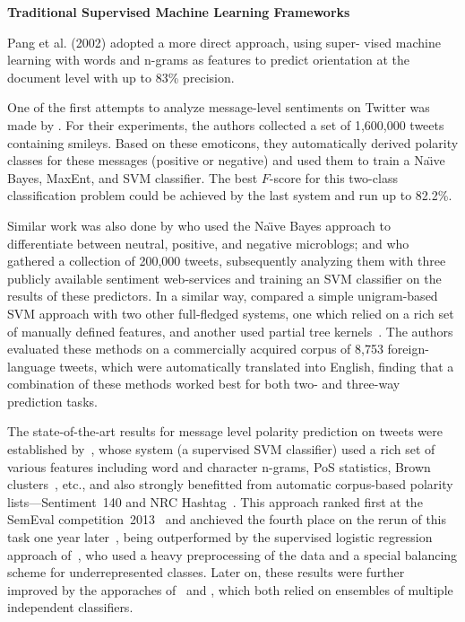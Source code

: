 
\textbf{Traditional Supervised Machine Learning Frameworks}


Pang et al.  (2002) adopted a more direct approach, using super- vised
machine learning with words and n-grams as features to predict
orientation at the document level with up to 83\% precision.

\todo[inline]{}

One of the first attempts to analyze message-level sentiments on
Twitter was made by \citet{Go:09}.  For their experiments, the authors
collected a set of 1,600,000 tweets containing smileys.  Based on
these emoticons, they automatically derived polarity classes for these
messages (positive or negative) and used them to train a Na\"{\i}ve
Bayes, MaxEnt, and SVM classifier.  The best $F$-score for this
two-class classification problem could be achieved by the last system
and run up to 82.2\%.

Similar work was also done by \citet{Pak:10} who used the Na\"{\i}ve
Bayes approach to differentiate between neutral, positive, and
negative microblogs; and \citet{Barbosa:10} who gathered a collection
of 200,000 tweets, subsequently analyzing them with three publicly
available sentiment web-services and training an SVM classifier on the
results of these predictors.  In a similar way, \citet{Agarwal:11}
compared a simple unigram-based SVM approach with two other
full-fledged systems, one which relied on a rich set of manually
defined features, and another used partial tree
kernels~\cite{Moschitti:06}.  The authors evaluated these methods on a
commercially acquired corpus of 8,753 foreign-language tweets, which
were automatically translated into English, finding that a combination
of these methods worked best for both two- and three-way prediction
tasks.

The state-of-the-art results for message level polarity prediction on
tweets were established by~\citet{Mohammad:13}, whose system (a
supervised SVM classifier) used a rich set of various features
including word and character n-grams, PoS statistics, Brown
clusters~\cite{Brown:92}, etc., and also strongly benefitted from
automatic corpus-based polarity lists---Sentiment~140 and NRC
Hashtag~\cite{Mohammad:12,Kiritchenko:14}.  This approach ranked first
at the SemEval competition~2013~\cite{Nakov:13} and anchieved the
fourth place on the rerun of this task one year
later~\cite{Rosenthal:14}, being outperformed by the supervised
logistic regression approach of~\citet{Miura:14}, who used a heavy
preprocessing of the data and a special balancing scheme for
underrepresented classes.  Later on, these results were further
improved by the apporaches of~\citet{Hagen:15} and \citet{Deriu:16},
which both relied on ensembles of multiple independent classifiers.


